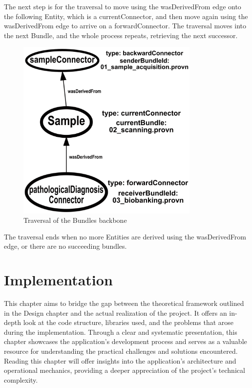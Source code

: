 \documentclass[
  digital,     %
  oneside,     %
  nosansbold,  %
  nocolorbold, %
  lof,         %
  lot,         %
]{fithesis4}
\begin{document}
The next step is for the traversal to move using the wasDerivedFrom edge onto the following Entity, which is a currentConnector, and then move again using the wasDerivedFrom edge to arrive on a forwardConnector. The traversal moves into the next Bundle, and the whole process repeats, retrieving the next successor.

\begin{figure}[htbp]
  \begin{center}
    \includegraphics[width=9cm]{fithesis/images/examplebigger.png}
  \end{center}
  \caption{Traversal of the Bundles backbone}
  \label{fig:bundleexample4}
\end{figure}

The traversal ends when no more Entities are derived using the wasDerivedFrom edge, or there are no succeeding bundles.


\chapter{Implementation}
\shorthandoff{-}
This chapter aims to bridge the gap between the theoretical framework outlined in the Design chapter and the actual realization of the project. It offers an in-depth look at the code structure, libraries used, and the problems that arose during the implementation. Through a clear and systematic presentation, this chapter showcases the application's development process and serves as a valuable resource for understanding the practical challenges and solutions encountered. Reading this chapter will offer insights into the application's architecture and operational mechanics, providing a deeper appreciation of the project's technical complexity.
\end{document}
